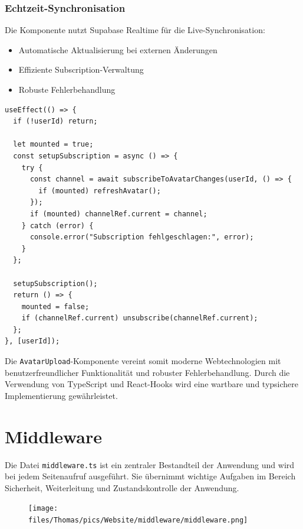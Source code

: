 \begin{inhalt}
\subsubsection{Echtzeit-Synchronisation}
Die Komponente nutzt Supabase Realtime für die Live-Synchronisation:
\begin{itemize}
    \item Automatische Aktualisierung bei externen Änderungen
    \item Effiziente Subscription-Verwaltung
    \item Robuste Fehlerbehandlung
\end{itemize}

\begin{lstlisting}[style=mytsx, caption={Implementierung der Echtzeit-Synchronisation}, label={lst:avatar_subscription}]
useEffect(() => {
  if (!userId) return;
  
  let mounted = true;
  const setupSubscription = async () => {
    try {
      const channel = await subscribeToAvatarChanges(userId, () => {
        if (mounted) refreshAvatar();
      });
      if (mounted) channelRef.current = channel;
    } catch (error) {
      console.error("Subscription fehlgeschlagen:", error);
    }
  };

  setupSubscription();
  return () => {
    mounted = false;
    if (channelRef.current) unsubscribe(channelRef.current);
  };
}, [userId]);
\end{lstlisting}

Die \texttt{AvatarUpload}-Komponente vereint somit moderne Webtechnologien mit benutzerfreundlicher Funktionalität und robuster Fehlerbehandlung. Durch die Verwendung von TypeScript und React-Hooks wird eine wartbare und typsichere Implementierung gewährleistet.







\newpage

\section{Middleware}
\label{ref:middelware}

Die Datei \texttt{middleware.ts} ist ein zentraler Bestandteil der Anwendung und wird bei jedem Seitenaufruf ausgeführt.  
Sie übernimmt wichtige Aufgaben im Bereich Sicherheit, Weiterleitung und Zustandskontrolle der Anwendung.  

\begin{figure}[!htb]
\centering
\texttt{[image: files/Thomas/pics/Website/middleware/middleware.png]}
\caption[Bildbezeichnung für Abbildungsverzeichnis]{}
\label{fig:middleware}
\end{figure}


\end{inhalt}
